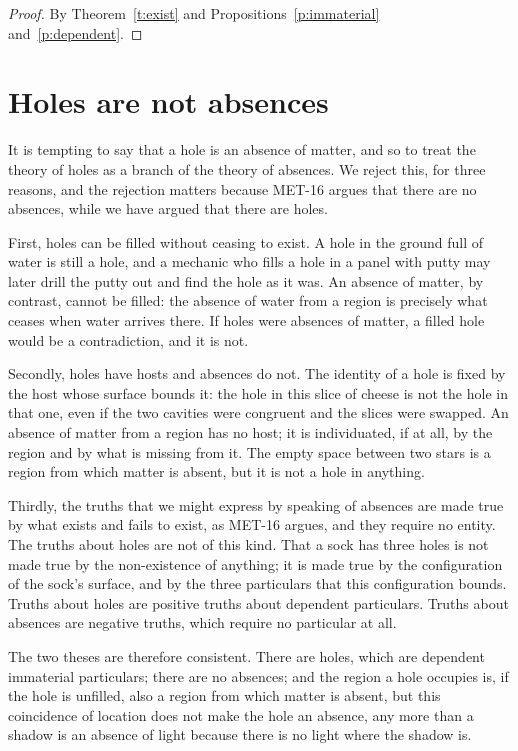 \documentclass{situationist-preprint}
\begin{document}
\begin{proof}
By Theorem~\ref{t:exist} and Propositions~\ref{p:immaterial} and~\ref{p:dependent}.
\end{proof}

\section{Holes are not absences}

It is tempting to say that a hole is an absence of matter, and so to treat the theory of holes as a branch of the theory of absences. We reject this, for three reasons, and the rejection matters because MET-16 argues that there are no absences, while we have argued that there are holes.

First, holes can be filled without ceasing to exist. A hole in the ground full of water is still a hole, and a mechanic who fills a hole in a panel with putty may later drill the putty out and find the hole as it was. An absence of matter, by contrast, cannot be filled: the absence of water from a region is precisely what ceases when water arrives there. If holes were absences of matter, a filled hole would be a contradiction, and it is not.

Secondly, holes have hosts and absences do not. The identity of a hole is fixed by the host whose surface bounds it: the hole in this slice of cheese is not the hole in that one, even if the two cavities were congruent and the slices were swapped. An absence of matter from a region has no host; it is individuated, if at all, by the region and by what is missing from it. The empty space between two stars is a region from which matter is absent, but it is not a hole in anything.

Thirdly, the truths that we might express by speaking of absences are made true by what exists and fails to exist, as MET-16 argues, and they require no entity. The truths about holes are not of this kind. That a sock has three holes is not made true by the non-existence of anything; it is made true by the configuration of the sock's surface, and by the three particulars that this configuration bounds. Truths about holes are positive truths about dependent particulars. Truths about absences are negative truths, which require no particular at all.

The two theses are therefore consistent. There are holes, which are dependent immaterial particulars; there are no absences; and the region a hole occupies is, if the hole is unfilled, also a region from which matter is absent, but this coincidence of location does not make the hole an absence, any more than a shadow is an absence of light because there is no light where the shadow is.
\end{document}
